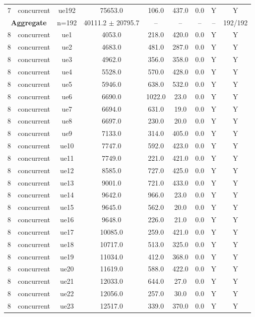 \begin{table}[ht]
\begin{tabular}{|c|c|c|c|c|c|c|c|c|}
7 & concurrent & ue192 & 75653.0 & 106.0 & 437.0 & 0.0 & Y & Y \\
\multicolumn{2}{|c|}{\textbf{Aggregate}} & n=192 & 40111.2 $\pm$ 20795.7 & -- & -- & -- & -- & 192/192 \\
\hline
8 & concurrent & ue1 & 4053.0 & 218.0 & 420.0 & 0.0 & Y & Y \\
8 & concurrent & ue2 & 4683.0 & 481.0 & 287.0 & 0.0 & Y & Y \\
8 & concurrent & ue3 & 4962.0 & 356.0 & 358.0 & 0.0 & Y & Y \\
8 & concurrent & ue4 & 5528.0 & 570.0 & 428.0 & 0.0 & Y & Y \\
8 & concurrent & ue5 & 5946.0 & 638.0 & 532.0 & 0.0 & Y & Y \\
8 & concurrent & ue6 & 6690.0 & 1022.0 & 23.0 & 0.0 & Y & Y \\
8 & concurrent & ue7 & 6694.0 & 631.0 & 19.0 & 0.0 & Y & Y \\
8 & concurrent & ue8 & 6697.0 & 230.0 & 20.0 & 0.0 & Y & Y \\
8 & concurrent & ue9 & 7133.0 & 314.0 & 405.0 & 0.0 & Y & Y \\
8 & concurrent & ue10 & 7747.0 & 592.0 & 423.0 & 0.0 & Y & Y \\
8 & concurrent & ue11 & 7749.0 & 221.0 & 421.0 & 0.0 & Y & Y \\
8 & concurrent & ue12 & 8585.0 & 727.0 & 425.0 & 0.0 & Y & Y \\
8 & concurrent & ue13 & 9001.0 & 721.0 & 433.0 & 0.0 & Y & Y \\
8 & concurrent & ue14 & 9642.0 & 966.0 & 23.0 & 0.0 & Y & Y \\
8 & concurrent & ue15 & 9645.0 & 562.0 & 20.0 & 0.0 & Y & Y \\
8 & concurrent & ue16 & 9648.0 & 226.0 & 21.0 & 0.0 & Y & Y \\
8 & concurrent & ue17 & 10085.0 & 259.0 & 421.0 & 0.0 & Y & Y \\
8 & concurrent & ue18 & 10717.0 & 513.0 & 325.0 & 0.0 & Y & Y \\
8 & concurrent & ue19 & 11034.0 & 412.0 & 368.0 & 0.0 & Y & Y \\
8 & concurrent & ue20 & 11619.0 & 588.0 & 422.0 & 0.0 & Y & Y \\
8 & concurrent & ue21 & 12033.0 & 644.0 & 27.0 & 0.0 & Y & Y \\
8 & concurrent & ue22 & 12056.0 & 257.0 & 30.0 & 0.0 & Y & Y \\
8 & concurrent & ue23 & 12517.0 & 339.0 & 370.0 & 0.0 & Y & Y \\

\end{tabular}
\end{table}
